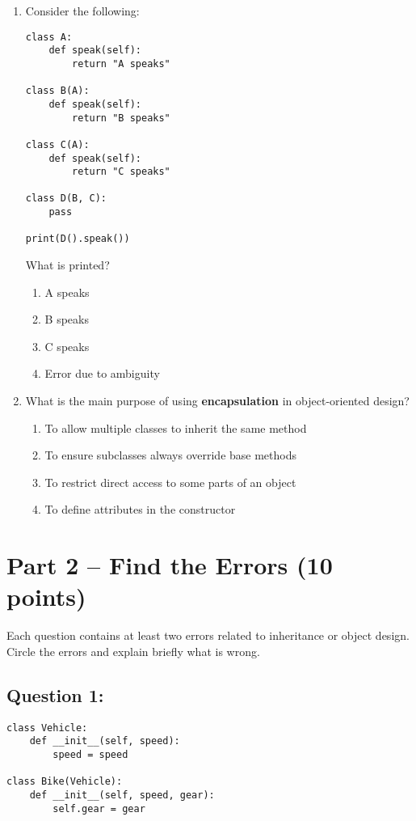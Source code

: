 \documentclass[11pt]{article}
\begin{document}
\begin{enumerate}[label=\arabic*.]
    \newpage

    \item Consider the following:

\begin{verbatim}
class A:
    def speak(self):
        return "A speaks"

class B(A):
    def speak(self):
        return "B speaks"

class C(A):
    def speak(self):
        return "C speaks"

class D(B, C):
    pass

print(D().speak())
\end{verbatim}

What is printed?
    \begin{enumerate}[label=\alph*)]
        \item A speaks
        \item B speaks
        \item C speaks
        \item Error due to ambiguity
    \end{enumerate}

    \item What is the main purpose of using \textbf{encapsulation} in object-oriented design?
    \begin{enumerate}[label=\alph*)]
        \item To allow multiple classes to inherit the same method
        \item To ensure subclasses always override base methods
        \item To restrict direct access to some parts of an object
        \item To define attributes in the constructor
    \end{enumerate}
\end{enumerate}

\newpage

\section*{Part 2 – Find the Errors (10 points)}

Each question contains at least two errors related to inheritance or object design. Circle the errors and explain briefly what is wrong.

\subsection*{Question 1:}
\begin{verbatim}
class Vehicle:
    def __init__(self, speed):
        speed = speed

class Bike(Vehicle):
    def __init__(self, speed, gear):
        self.gear = gear
\end{verbatim}
\end{document}
